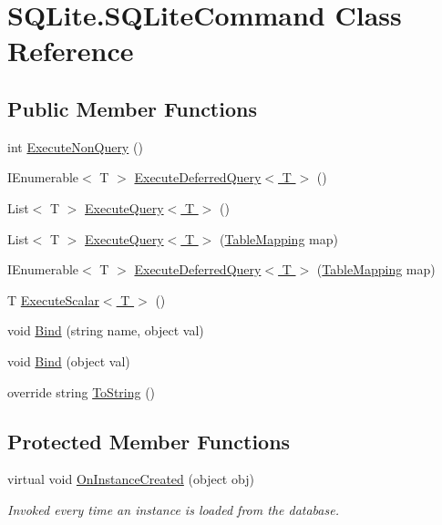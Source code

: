 \hypertarget{class_s_q_lite_1_1_s_q_lite_command}{\section{S\+Q\+Lite.\+S\+Q\+Lite\+Command Class Reference}
\label{class_s_q_lite_1_1_s_q_lite_command}
}
\subsection*{Public Member Functions}
\begin{DoxyCompactItemize}
\item 
int \hyperlink{class_s_q_lite_1_1_s_q_lite_command_a7a2b9afd67f691520b73bfb0efb18b9b}{Execute\+Non\+Query} ()
\item 
I\+Enumerable$<$ T $>$ \hyperlink{class_s_q_lite_1_1_s_q_lite_command_a28f64ff5f495468d9f480bd5d1b4338d}{Execute\+Deferred\+Query$<$ T $>$} ()
\item 
List$<$ T $>$ \hyperlink{class_s_q_lite_1_1_s_q_lite_command_a6aa1993738e35a863eea4c5d7cee212e}{Execute\+Query$<$ T $>$} ()
\item 
List$<$ T $>$ \hyperlink{class_s_q_lite_1_1_s_q_lite_command_a89a1919e9f583731eaabaf12e1982e39}{Execute\+Query$<$ T $>$} (\hyperlink{class_s_q_lite_1_1_table_mapping}{Table\+Mapping} map)
\item 
I\+Enumerable$<$ T $>$ \hyperlink{class_s_q_lite_1_1_s_q_lite_command_a092913169afcc6c9fdd9ae5e5ca7cf96}{Execute\+Deferred\+Query$<$ T $>$} (\hyperlink{class_s_q_lite_1_1_table_mapping}{Table\+Mapping} map)
\item 
T \hyperlink{class_s_q_lite_1_1_s_q_lite_command_a3ce415ca55779eaf3d1851060eff05cc}{Execute\+Scalar$<$ T $>$} ()
\item 
void \hyperlink{class_s_q_lite_1_1_s_q_lite_command_adc2e4047e52cc3da0307a74e74e276f7}{Bind} (string name, object val)
\item 
void \hyperlink{class_s_q_lite_1_1_s_q_lite_command_afd03d0602268aef6f9300d60f6102265}{Bind} (object val)
\item 
override string \hyperlink{class_s_q_lite_1_1_s_q_lite_command_a6d1c61aa253c05e163506aec881bfb49}{To\+String} ()
\end{DoxyCompactItemize}
\subsection*{Protected Member Functions}
\begin{DoxyCompactItemize}
\item 
virtual void \hyperlink{class_s_q_lite_1_1_s_q_lite_command_a4761647a6b02f398aa1d7bbd1f090828}{On\+Instance\+Created} (object obj)
\begin{DoxyCompactList}\small\item\em Invoked every time an instance is loaded from the database. \end{DoxyCompactList}\end{DoxyCompactItemize}
